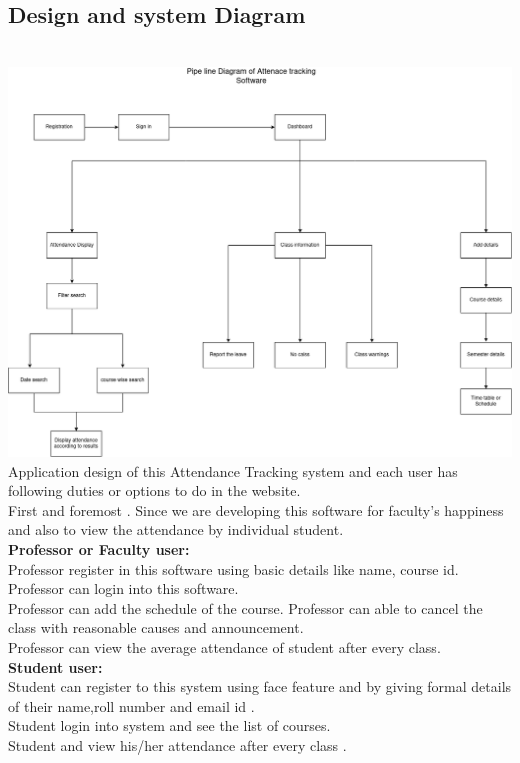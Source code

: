\documentclass[conference]{IEEEtran}
\begin{document}
\subsection{Design and system Diagram}
\\[3mm]
\includegraphics[width=\linewidth]{pieline.png}\\
Application design of this Attendance Tracking system and each user has following duties or options to do in the website.\\[1mm]
First and foremost . Since we are developing this software for faculty's happiness and also to  view the attendance by individual student.\\
\textbf{Professor or Faculty user:}\\[2mm]
Professor register in this software using basic details like name, course id.\\
Professor can login into this software.\\
Professor can add the schedule of the course.
Professor can able to cancel the class with reasonable causes and announcement.\\
Professor can  view the average attendance of student after every class.\\[3mm]
\textbf{Student user:}\\[2mm]
Student can register to this system using face feature and by giving formal details of their name,roll number and email id .\\[1mm]
Student login into system and see the list of courses.\\[1mm]
Student and view his/her attendance after every class .\\[1mm]
\end{document}
